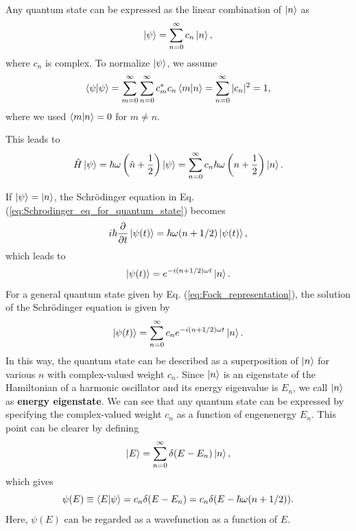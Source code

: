 \documentclass{book}
\begin{document}
Any quantum state can be expressed as the linear combination of $\ket n$ as
\begin{equation}
  \ket \psi = \sum_{n=0}^{\infty}c_n\ket n,
  \label{eq:Fock_representation}
\end{equation}
where $c_n$ is complex. To normalize $\ket \psi$, we assume
\begin{equation}
  \braket{\psi|\psi} = \sum_{m=0}^{\infty}\sum_{n=0}^{\infty}c_m^*c_n\braket{m|n}=\sum_{n = 0}^{\infty}|c_n|^2 = 1,
\end{equation}
where we used $\braket{m|n} = 0$ for $m\neq n$. 

This leads to
\begin{equation}
  \hat H \ket \psi = \hbar \omega \left(\hat n + \frac 1 2 \right)\ket \psi = \sum_{n=0}^{\infty} c_n \hbar \omega \left(n + \frac{1}{2}\right)\ket n.
\end{equation}

If $\ket \psi = \ket n$, the Schr\"odinger equation in Eq. (\ref{eq:Schrodinger_eq_for_quantum_state}) becomes 
\begin{equation}
  i\hbar \frac{\partial}{\partial t}\ket{\psi(t)}= \hbar \omega (n + 1/2)\ket {\psi(t)},
\end{equation}
which leads to
\begin{equation}
  \ket{\psi(t)} = e^{-i(n + 1/2)\omega t}\ket n.
\end{equation}
For a general quantum state given by Eq. (\ref{eq:Fock_representation}), the solution of the Schr\"odinger equation is given by
\begin{equation}
  \ket{\psi(t)} = \sum_{n=0}^{\infty}c_n e^{-i(n+1/2)\omega t}\ket n.
\end{equation}
In this way, the quantum state can be described as a superposition of $\ket n$ for various $n$ with complex-valued weight $c_n$. Since $\ket n$ is an eigenstate of the Hamiltonian of a harmonic oscillator and its energy eigenvalue is $E_n$, we call $\ket n$ as \textbf{energy eigenstate}. We can see that any quantum state can be expressed by specifying the complex-valued weight $c_n$ as a function of engenenergy $E_n$. This point can be clearer by defining 
\begin{equation}
  \ket{E} = \sum_{n=0}^{\infty}\delta(E-E_n)\ket n,
\end{equation}
which gives
\begin{equation}
  \psi(E) \equiv \braket{E|\psi} = c_n\delta(E-E_n) = c_n\delta(E-\hbar \omega (n + 1/2)).
\end{equation}
Here, $\psi(E)$ can be regarded as a wavefunction as a function of $E$.
\end{document}
